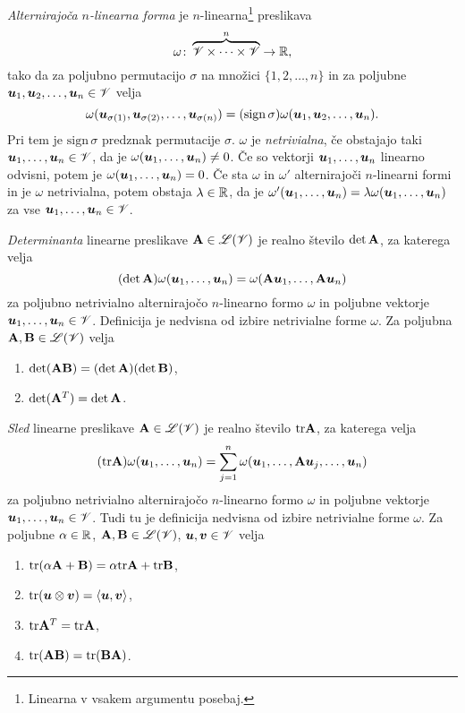 \emph{Alternirajoča $n$-linearna forma} je $n$-linearna\footnote{Linearna v vsakem argumentu posebaj.} preslikava
\[ \omega\colon\overbrace{\mathscr V\times\dots\times\mathscr V}^{n}\to\mathbb R, \]
tako da za poljubno permutacijo $\sigma$ na množici $\{1,2,\dots,n\}$ in za poljubne
$\boldsymbol u_1,\boldsymbol u_2,\dots,\boldsymbol u_n\in\mathscr V$ velja
\[
	\omega(\boldsymbol u_{\sigma(1)},\boldsymbol u_{\sigma(2)},\dots,\boldsymbol u_{\sigma(n)})
	=(\mathrm{sign}\,\sigma)\omega(\boldsymbol u_1,\boldsymbol u_2,\dots,\boldsymbol u_n).
\]
Pri tem je $\mathrm{sign}\,\sigma$ predznak permutacije $\sigma$. $\omega$ je \emph{netrivialna},
če obstajajo taki $\boldsymbol u_1,\dots,\boldsymbol u_n\in\mathscr V$, da je $\omega(\boldsymbol u_1,\dots,\boldsymbol u_n)\neq 0$.
Če so vektorji $\boldsymbol u_1,\dots,\boldsymbol u_n$ linearno odvisni, potem je $\omega(\boldsymbol u_1,\dots,\boldsymbol u_n)=0$.
Če sta $\omega$ in $\omega'$ alternirajoči $n$-linearni formi in je $\omega$ netrivialna, potem
obstaja $\lambda\in\mathbb R$, da je $\omega'(\boldsymbol u_1,\dots,\boldsymbol u_n)=\lambda\omega(\boldsymbol u_1,\dots,\boldsymbol u_n)$
za vse $\boldsymbol u_1,\dots,\boldsymbol u_n\in\mathscr V$.

\emph{Determinanta} linearne preslikave $\mathbf A\in\mathscr L(\mathscr V)$ je realno število $\det\mathbf A$,
za katerega velja
\[
	(\det\mathbf A)\omega(\boldsymbol u_1,\dots,\boldsymbol u_n)=\omega(\mathbf A\boldsymbol u_1,\dots,\mathbf A\boldsymbol u_n)
\]
za poljubno netrivialno alternirajočo $n$-linearno formo $\omega$ in poljubne vektorje $\boldsymbol u_1,\dots,\boldsymbol u_n\in\mathscr V$.
Definicija je nedvisna od izbire netrivialne forme $\omega$. Za poljubna $\mathbf A,\mathbf B\in\mathscr L(\mathscr V)$ velja
\begin{enumerate}[noitemsep]
	\item $\det(\mathbf A\mathbf B)=(\det\mathbf A)(\det\mathbf B)$,
	\item $\det(\mathbf A^T)=\det\mathbf A$.
\end{enumerate}

\emph{Sled} linearne preslikave $\mathbf A\in\mathscr L(\mathscr V)$ je realno število $\mathrm{tr}\mathbf A$,
za katerega velja
\[
	(\mathrm{tr}\mathbf A)\omega(\boldsymbol u_1,\dots,\boldsymbol u_n)
	=\sum_{j=1}^n\omega(\boldsymbol u_1,\dots,\mathbf A\boldsymbol u_j,\dots,\boldsymbol u_n)
\]
za poljubno netrivialno alternirajočo $n$-linearno formo $\omega$ in poljubne vektorje $\boldsymbol u_1,\dots,\boldsymbol u_n\in\mathscr V$.
Tudi tu je definicija nedvisna od izbire netrivialne forme $\omega$.
Za poljubne $\alpha\in\mathbb R$, $\mathbf A,\mathbf B\in\mathscr L(\mathscr V)$, $\boldsymbol u,\boldsymbol v\in\mathscr V$ velja
\begin{enumerate}[noitemsep] \label{traceprop}
	\item $\mathrm{tr}(\alpha\mathbf A+\mathbf B)=\alpha\mathrm{tr}\mathbf A+\mathrm{tr}\mathbf B$,
	\item $\mathrm{tr}(\boldsymbol u\otimes\boldsymbol v)=\langle\boldsymbol u,\boldsymbol v\rangle$,
	\item $\mathrm{tr}\mathbf A^T=\mathrm{tr}\mathbf A$,
	\item $\mathrm{tr}(\mathbf A\mathbf B)=\mathrm{tr}(\mathbf B\mathbf A)$.
\end{enumerate}

